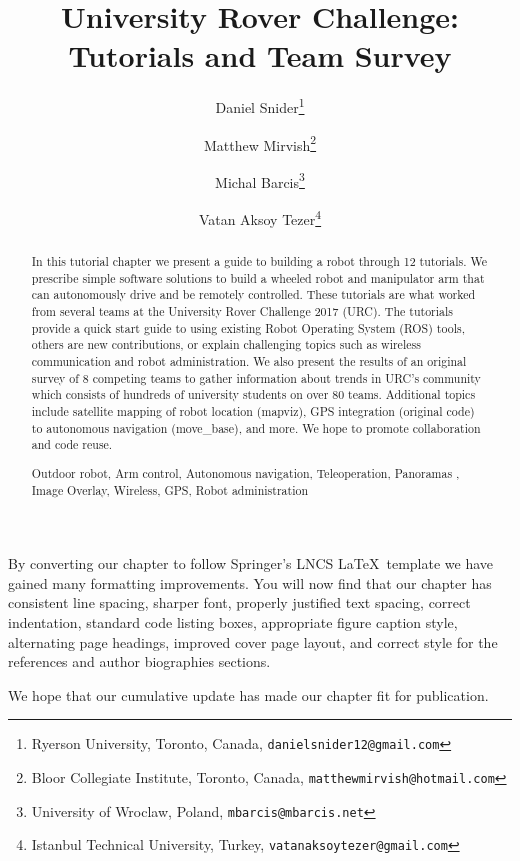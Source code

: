 \documentclass[runningheads,a4paper]{llncs}
\newcommand{\keywords}[1]{\par\addvspace\baselineskip
\noindent\keywordname\enspace\ignorespaces#1}
\begin{document}
By converting our chapter to follow Springer's LNCS \LaTeX\ template we have gained many formatting improvements. You will now find that our chapter has consistent line spacing, sharper font, properly justified text spacing, correct indentation, standard code listing boxes, appropriate figure caption style, alternating page headings, improved cover page layout, and correct style for the references and author biographies sections.

We hope that our cumulative update has made our chapter fit for publication.

\newpage

\endgroup
\setcounter{page}{1}
\setcounter{page}{1}




\title{University Rover Challenge: Tutorials and Team Survey}
\author{Daniel Snider\thanks{Ryerson University, Toronto, Canada, \texttt{danielsnider12@gmail.com}} \and Matthew Mirvish\thanks{Bloor Collegiate Institute, Toronto, Canada, \texttt{matthewmirvish@hotmail.com}} \and Michal Barcis\thanks{University of Wroclaw, Poland, \texttt{mbarcis@mbarcis.net}} \and Vatan Aksoy Tezer\thanks{Istanbul Technical University, Turkey, \texttt{vatanaksoytezer@gmail.com}}}
\institute{}
\maketitle

\begin{abstract}
In this tutorial chapter we present a guide to building a robot through 12 tutorials. We prescribe simple software solutions to build a wheeled robot and manipulator arm that can autonomously drive and be remotely controlled. These tutorials are what worked from several teams at the University Rover Challenge 2017 (URC). The tutorials provide a quick start guide to using existing Robot Operating System (ROS) tools, others are new contributions, or explain challenging topics such as wireless communication and robot administration. We also present the results of an original survey of 8 competing teams to gather information about trends in URC's community which consists of hundreds of university students on over 80 teams. Additional topics include satellite mapping of robot location (mapviz), GPS integration (original code) to autonomous navigation (move\_base), and more. We hope to promote collaboration and code reuse. 
\keywords{Outdoor robot, Arm control, Autonomous navigation, Teleoperation, Panoramas , Image Overlay, Wireless, GPS, Robot administration}
\end{abstract}
\end{document}
